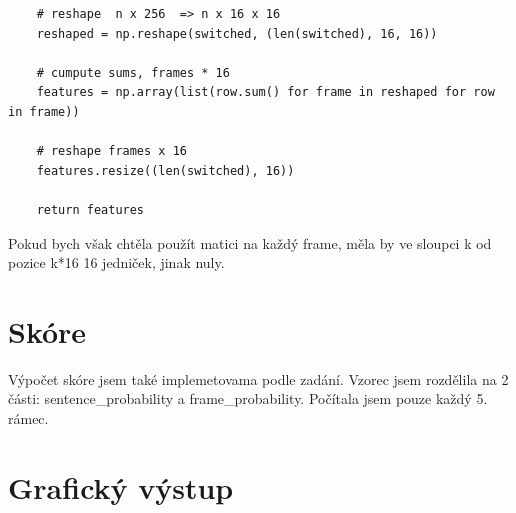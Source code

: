 \documentclass[10pt, a4paper]{article}
\begin{document}
\begin{flushleft}
\begin{lstlisting}
    # reshape  n x 256  => n x 16 x 16
    reshaped = np.reshape(switched, (len(switched), 16, 16))

    # cumpute sums, frames * 16
    features = np.array(list(row.sum() for frame in reshaped for row in frame))

    # reshape frames x 16
    features.resize((len(switched), 16))

    return features
\end{lstlisting}

Pokud bych však chtěla použít matici na každý frame, měla by ve sloupci k od pozice k*16 16 jedniček, jinak nuly.

\section{Skóre}
Výpočet skóre jsem také implemetovama podle zadání. Vzorec jsem rozdělila na 2 části: sentence\_probability a frame\_probability. Počítala jsem pouze každý 5. rámec.

\section{Grafický výstup}
\begin{figure}[H]
	\\
	\\
	\\
\end{figure}


\end{flushleft}
\end{document}
